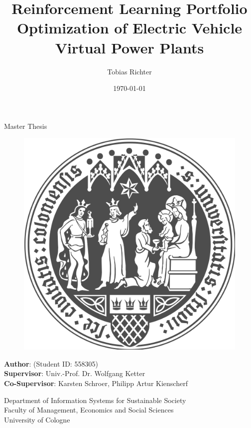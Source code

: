 \documentclass[a4paper, 12pt]{article}
\author{Tobias Richter}
\date{\today}
\title{Reinforcement Learning Portfolio Optimization of Electric Vehicle Virtual Power Plants}
\newcommand{\studentID}{558305}
\newcommand{\thesistype}{Master Thesis}
\newcommand{\supervisor}{Univ.-Prof. Dr. Wolfgang Ketter}
\newcommand{\cosupervisor}{Karsten Schroer, Philipp Artur Kienscherf}
\begin{document}
\makeatletter
\begin{titlepage}
    \begin{center}
        \vspace*{1cm}

        \Large
        \textbf{\@title{}}

        \vspace{1.5cm}

        \thesistype{}

        \vspace{1cm}

        \begin{figure}[htbp]
             \centering
             \includegraphics[width=.5\linewidth]{./fig/UoC_Logo.png}
        \end{figure}

        \vspace{1cm}

        \large
        \textbf{Author}: \@author{} (Student ID: \studentID{})\\
        \large
        \textbf{Supervisor}: \supervisor{}\\
        \large
        \textbf{Co-Supervisor}: \cosupervisor{}

        \vspace{1cm}
        \large
        Department of Information Systems for Sustainable Society\\
        Faculty of Management, Economics and Social Sciences\\
        University of Cologne\\

        \vspace{1cm}
        \@date{}

    \end{center}
\end{titlepage}
\makeatother
\clearpage
\thispagestyle{empty}
\end{document}
